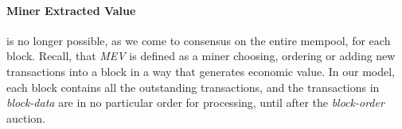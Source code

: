 \documentclass[12pt]{article}
\begin{document}
\paragraph*{Miner Extracted Value} is no longer possible, as we come to consensus on the entire mempool, for each block. Recall, that \emph{MEV} is defined as a miner choosing, ordering or adding new transactions into a block in a way that generates economic value.  In our model, each block contains all the outstanding transactions, and the transactions in \emph{block-data} are in no particular order for processing, until after the \emph{block-order} auction. 

 
\newpage
{}

% 
\end{document}
